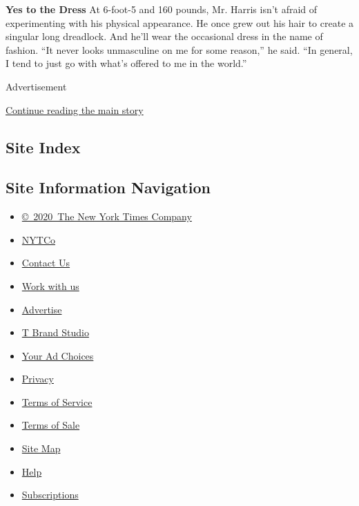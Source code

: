 \textbf{Yes to the Dress} At 6-foot-5 and 160 pounds, Mr. Harris isn't
afraid of experimenting with his physical appearance. He once grew out
his hair to create a singular long dreadlock. And he'll wear the
occasional dress in the name of fashion. ``It never looks unmasculine on
me for some reason,'' he said. ``In general, I tend to just go with
what's offered to me in the world.''

Advertisement

\protect\hyperlink{after-bottom}{Continue reading the main story}

\hypertarget{site-index}{%
\subsection{Site Index}\label{site-index}}

\hypertarget{site-information-navigation}{%
\subsection{Site Information
Navigation}\label{site-information-navigation}}

\begin{itemize}
\tightlist
\item
  \href{https://help.nytimes.com/hc/en-us/articles/115014792127-Copyright-notice}{©~2020~The
  New York Times Company}
\end{itemize}

\begin{itemize}
\tightlist
\item
  \href{https://www.nytco.com/}{NYTCo}
\item
  \href{https://help.nytimes.com/hc/en-us/articles/115015385887-Contact-Us}{Contact
  Us}
\item
  \href{https://www.nytco.com/careers/}{Work with us}
\item
  \href{https://nytmediakit.com/}{Advertise}
\item
  \href{http://www.tbrandstudio.com/}{T Brand Studio}
\item
  \href{https://www.nytimes.com/privacy/cookie-policy\#how-do-i-manage-trackers}{Your
  Ad Choices}
\item
  \href{https://www.nytimes.com/privacy}{Privacy}
\item
  \href{https://help.nytimes.com/hc/en-us/articles/115014893428-Terms-of-service}{Terms
  of Service}
\item
  \href{https://help.nytimes.com/hc/en-us/articles/115014893968-Terms-of-sale}{Terms
  of Sale}
\item
  \href{https://spiderbites.nytimes.com}{Site Map}
\item
  \href{https://help.nytimes.com/hc/en-us}{Help}
\item
  \href{https://www.nytimes.com/subscription?campaignId=37WXW}{Subscriptions}
\end{itemize}
